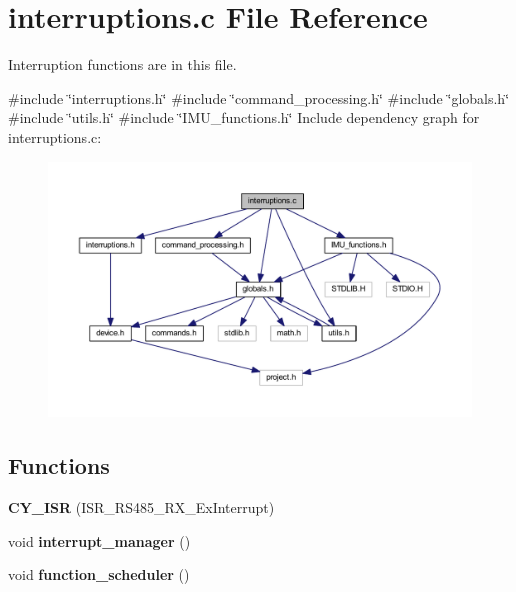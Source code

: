 \section{interruptions.\+c File Reference}
\label{interruptions_8c}


Interruption functions are in this file.  


{\ttfamily \#include \char`\"{}interruptions.\+h\char`\"{}}\newline
{\ttfamily \#include \char`\"{}command\+\_\+processing.\+h\char`\"{}}\newline
{\ttfamily \#include \char`\"{}globals.\+h\char`\"{}}\newline
{\ttfamily \#include \char`\"{}utils.\+h\char`\"{}}\newline
{\ttfamily \#include \char`\"{}I\+M\+U\+\_\+functions.\+h\char`\"{}}\newline
Include dependency graph for interruptions.\+c\+:
\nopagebreak
\begin{figure}[H]
\begin{center}
\leavevmode
\includegraphics[width=350pt]{interruptions_8c__incl}
\end{center}
\end{figure}
\subsection*{Functions}
\begin{DoxyCompactItemize}
\item 
\mbox{\label{interruptions_8c_a7692d8c3185943c5bdfaa6de0a172ad3}} 
{\bfseries C\+Y\+\_\+\+I\+SR} (I\+S\+R\+\_\+\+R\+S485\+\_\+\+R\+X\+\_\+\+Ex\+Interrupt)
\item 
\mbox{\label{interruptions_8c_a9790811526002d99b25a814afd02cbae}} 
void {\bfseries interrupt\+\_\+manager} ()
\item 
\mbox{\label{interruptions_8c_a0fe51278c957933282ca63f3ac9beeaf}} 
void {\bfseries function\+\_\+scheduler} ()
\end{DoxyCompactItemize}


